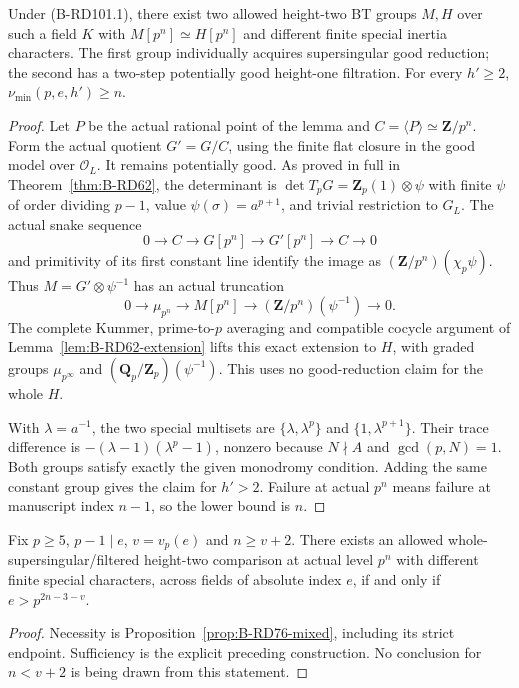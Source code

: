 \begin{proposition}
\label{prop:B-RD101-ambiguity}
Under (B-RD101.1), there exist two allowed height-two
BT groups $M,H$ over such a field $K$ with
$M[p^n]\simeq H[p^n]$ and different finite special
inertia characters. The first group individually acquires
supersingular good reduction; the second has a two-step
potentially good height-one filtration.
For every $h'\ge2$, $\nu_{\min}(p,e,h')\ge n$.
\end{proposition}
\begin{proof}
Let $P$ be the actual rational point of the lemma and
$C=\langle P\rangle\simeq\mathbf Z/p^n$.
Form the actual quotient $G'=G/C$, using the finite
flat closure in the good model over $\mathcal O_L$.
It remains potentially good. As proved in full in
Theorem~\ref{thm:B-RD62}, the determinant is
$\det T_pG=\mathbf Z_p(1)\otimes\psi$ with finite
$\psi$ of order dividing $p-1$, value
$\psi(\sigma)=a^{p+1}$, and trivial restriction to $G_L$.
The actual snake sequence
\[
 0\longrightarrow C\longrightarrow G[p^n]
 \longrightarrow G'[p^n]\longrightarrow C\longrightarrow0
                                                        \tag{B-RD101.11}
\]
and primitivity of its first constant line identify the
image as $(\mathbf Z/p^n)(\chi_p\psi)$.
Thus $M=G'\otimes\psi^{-1}$ has an actual truncation
\[
 0\longrightarrow\mu_{p^n}\longrightarrow M[p^n]
 \longrightarrow(\mathbf Z/p^n)(\psi^{-1})
 \longrightarrow0 .                                   \tag{B-RD101.12}
\]
The complete Kummer, prime-to-$p$ averaging and compatible
cocycle argument of Lemma~\ref{lem:B-RD62-extension}
lifts this exact extension to $H$, with graded groups
$\mu_{p^\infty}$ and
$(\mathbf Q_p/\mathbf Z_p)(\psi^{-1})$.
This uses no good-reduction claim for the whole $H$.

With $\lambda=a^{-1}$, the two special multisets are
$\{\lambda,\lambda^p\}$ and
$\{1,\lambda^{p+1}\}$. Their trace difference is
$-(\lambda-1)(\lambda^p-1)$, nonzero because
$N\nmid A$ and $\gcd(p,N)=1$.
Both groups satisfy exactly the given monodromy condition.
Adding the same constant group gives the claim for $h'>2$.
Failure at actual $p^n$ means failure at manuscript
index $n-1$, so the lower bound is $n$.
\end{proof}

\begin{corollary}
\label{cor:B-RD101-threshold}
Fix $p\ge5$, $p-1\mid e$, $v=v_p(e)$ and $n\ge v+2$.
There exists an allowed whole-supersingular/filtered
height-two comparison at actual level $p^n$ with different
finite special characters, across fields of absolute index
$e$, if and only if $e>p^{2n-3-v}$.
\end{corollary}
\begin{proof}
Necessity is Proposition~\ref{prop:B-RD76-mixed},
including its strict endpoint. Sufficiency is the
explicit preceding construction. No conclusion for
$n<v+2$ is being drawn from this statement.
\end{proof}

